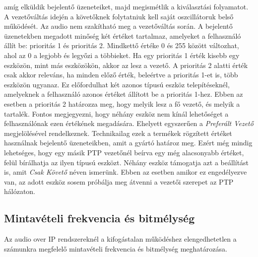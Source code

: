 amíg elküldik bejelentő üzeneteiket, majd megismétlik a kiválasztási folyamatot. 
A vezetőváltás idején a követőknek folytatniuk kell saját oszcillátoruk belső működését.
Az audio nem szakítható meg a vezetőváltás során.
A bejelentő üzenetekben megadott minőség két értéket tartalmaz, amelyeket a felhasználó állít be: prioritás 1 és prioritás 2.
Mindkettő értéke 0 és 255 között változhat, ahol az 0 a legjobb és legyőzi a többieket.
Ha egy prioritás 1 érték kisebb egy eszközön, mint más eszközökön,
akkor az lesz a vezető. A prioritás 2 alatti érték csak akkor releváns, ha
minden előző érték, beleértve a prioritás 1-et is, több eszközön ugyanaz. 
Ez előfordulhat két azonos típusú eszköz telepítéseknél, amelyeknek a felhasználó
azonos értéket állított be a prioritás 1-hez. Ebben az esetben a prioritás 2
határozza meg, hogy melyik lesz a fő vezető, és melyik a tartalék. 
Fontos megjegyezni, hogy néhány eszköz nem kínál lehetőséget a felhasználónak ezen értékének megadására.
Ehelyett egyszerűen a \textit{Preferált Vezető} megjelölésével rendelkeznek.
Technikailag ezek a termékek rögzített értéket használnak bejelentő üzeneteikben, amit a gyártó határoz meg.
Ezért még mindig lehetséges, hogy egy másik PTP vezetőnél beírva egy még alacsonyabb értéket, felül bírálhatja az ilyen típusú eszközt.
Néhány eszköz támogatja azt a beállítást is, amit \textit{Csak Követő} néven ismerünk. Ebben az esetben amikor ez engedélyezve van,
az adott eszköz sosem próbálja meg átvenni a vezetői szerepet az PTP hálózaton.
\subsection{Mintavételi frekvencia és bitmélység}
Az audio over IP rendszereknél a kifogástalan működéshez elengedhetetlen a számunkra
megfelelő mintavételi frekvencia és bitmélység meghatározása.

